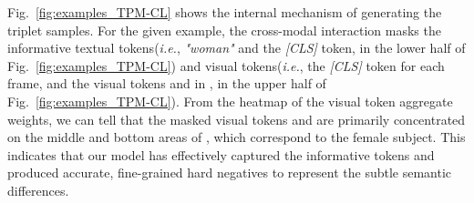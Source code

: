 \documentclass[sigconf]{acmart}
\begin{document}
Fig.~\ref{fig:examples_TPM-CL} shows the internal mechanism of generating the triplet samples. For the given example, the cross-modal interaction masks the informative textual tokens(\emph{i.e.}, \textit{"woman"} and the \textit{[CLS]} token, in the lower half of Fig.~\ref{fig:examples_TPM-CL}) and visual tokens(\emph{i.e.}, the \textit{[CLS]} token for each frame, and the visual tokens  and  in , in the upper half of Fig.~\ref{fig:examples_TPM-CL}). From the heatmap of the visual token aggregate weights, we can tell that the masked visual tokens  and  are primarily concentrated on the middle and bottom areas of , which correspond to the female subject.
This indicates that our model has effectively captured the informative tokens and produced accurate, fine-grained hard negatives to represent the subtle semantic differences.
\end{document}
